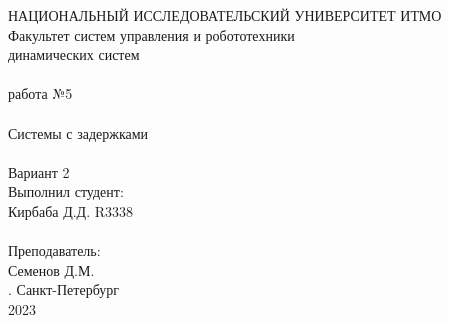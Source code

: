 \documentclass[12pt]{article}
\begin{document}
\begin{titlepage}
\begin{center}
    {\small НАЦИОНАЛЬНЫЙ ИССЛЕДОВАТЕЛЬСКИЙ УНИВЕРСИТЕТ ИТМО} \\
    {\small Факультет систем управления и робототехники} \\
    \vspace*{10\baselineskip}
    { динамических систем} \\
    \ \\
    { работа №5} \\
    \ \\
    {\LARGE Системы с задержками} \\
    \ \\
    Вариант 2 \\
    \vspace*{10\baselineskip}
    \hfill {\small Выполнил студент:} \\
    \hfill {\small Кирбаба Д.Д. R3338} \\
    \ \\
    \hfill {\small Преподаватель:} \\
    \hfill {\small Семенов Д.М.} \\
    \mbox{}
    \vfill {. Санкт-Петербург\\2023}
\end{center}
\end{titlepage}
\end{document}
